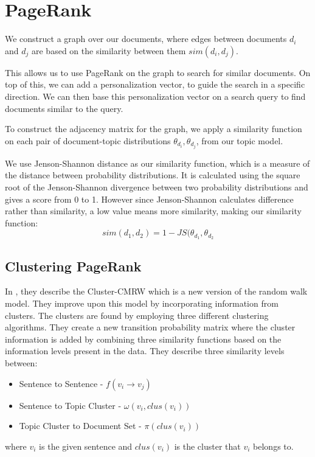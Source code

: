 \section{PageRank}\label{sec:pagerank}
We construct a graph over our documents, where edges between documents $d_i$ and $d_j$ are based on the similarity between them $sim(d_i, d_j)$.

This allows us to use PageRank on the graph to search for similar documents.
On top of this, we can add a personalization vector, to guide the search in a specific direction.
We can then base this personalization vector on a search query to find documents similar to the query.

To construct the adjacency matrix for the graph, we apply a similarity function on each pair of document-topic distributions $\theta_{d_i}, \theta_{d_j}$, from our topic model.

We use Jenson-Shannon distance as our similarity function, which is a measure of the distance between probability distributions\cite{jensen-shannon2003}\cite{jensen-shannondis2003}.
It is calculated using the square root of the Jenson-Shannon divergence between two probability distributions and gives a score from 0 to 1.
However since Jenson-Shannon calculates difference rather than similarity, a low value means more similarity, making our similarity function:
$$sim(d_1, d_2) = 1 - JS(\theta_{d_1}, \theta_{d_2}$$


\subsection{Clustering PageRank}

In \cite{ClusterPageRank}, they describe the \gls{Cluster-CMRW} which is a new version of the random walk model. 
They improve upon this model by incorporating information from clusters. 
The clusters are found by employing three different clustering algorithms.
They create a new transition probability matrix where the cluster information is added by combining three similarity functions based on the information levels present in the data.
They describe three similarity levels between:
\begin{itemize}
    \item Sentence to Sentence - $f(v_i \rightarrow v_j)$
    \item Sentence to Topic Cluster - $\omega(v_i, clus(v_i))$
    \item Topic Cluster to Document Set - $\pi(clus(v_i))$
\end{itemize}
where $v_i$ is the given sentence and $clus(v_i)$ is the cluster that $v_i$ belongs to.

